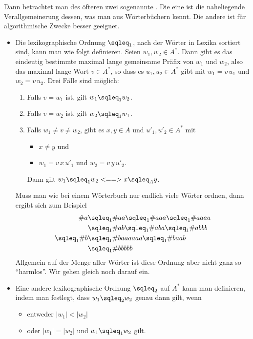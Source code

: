 Dann betrachtet man des öfteren zwei sogenannte
. Die eine ist die
naheliegende Verallgemeinerung dessen, was man aus Wörterbüchern
kennt. Die andere ist für algorithmische Zwecke besser geeignet.
\begin{itemize}
\item Die lexikographische Ordnung $\sqleq_1$, nach der Wörter in
  Lexika \usw sortiert sind, kann man wie folgt definieren. Seien
  $w_1,w_2\in A^*$. Dann gibt es das eindeutig bestimmte maximal lange
  gemeinsame Präfix von $w_1$ und $w_2$, also das maximal lange Wort
  $v\in A^*$, so dass es $u_1, u_2\in A^*$ gibt mit $w_1=v\,u_1$ und
  $w_2=v\,u_2$. Drei Fälle sind möglich:
  \begin{enumerate}
  \item\label{pkt:lex1} Falls $v=w_1$ ist, gilt $w_1\sqleq_1 w_2$.
  \item\label{pkt:lex2} Falls $v=w_2$ ist, gilt $w_2\sqleq_1 w_1$.
  \item\label{pkt:lex3} Falls $w_1\not=v\not=w_2$, gibt es $x,y\in
    A$ und $u'_1, u'_2\in A^*$ mit
    \begin{itemize}
    \item $x\not=y$ und
    \item $w_1=v\,x\,u'_1$ und $w_2=v\,y\,u'_2$.
    \end{itemize}
    Dann gilt $w_1\sqleq_1 w_2 <==> x\sqleq_A y$.
  \end{enumerate}
  Muss man wie bei einem Wörterbuch nur endlich viele Wörter ordnen,
  dann ergibt sich zum Beispiel
  \begin{align*}
    \#{a} &\sqleq_1 \#{aa} \sqleq_1 \#{aaa} \sqleq_1 \#{aaaa} \\
    &\sqleq_1 \#{ab} \sqleq_1 \#{aba} \sqleq_1 \#{abbb}\\
     \sqleq_1 \#{b} &\sqleq_1 \#{baaaaaa} \sqleq_1 \#{baab} \\
    &\sqleq_1 \#{bbbbb}
  \end{align*}
  Allgemein auf der Menge aller Wörter ist diese Ordnung aber nicht
  ganz so "`harmlos"'.  Wir gehen gleich noch darauf ein.
\item Eine andere lexikographische Ordnung $\sqleq_2$ auf $A^*$ kann
  man definieren, indem man festlegt, dass $w_1 \sqleq_2 w_2$ genau
  dann gilt, wenn
  \begin{itemize}
    \item entweder $|w_1| < |w_2|$
    \item oder $|w_1| = |w_2|$ und $w_1 \sqleq_1 w_2 $ gilt.

\end{itemize}
\end{itemize}
